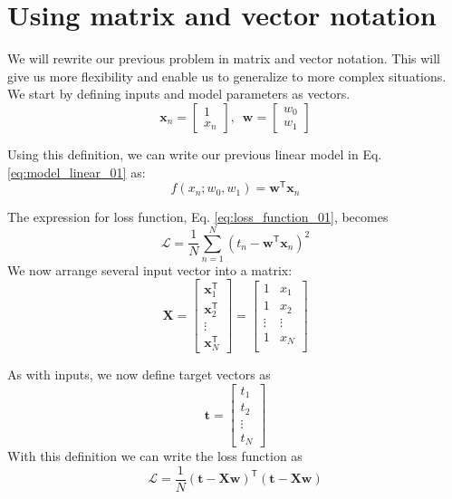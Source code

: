\section{Using matrix and vector notation}

We will rewrite our previous problem in matrix and vector notation. This will
give us more flexibility and enable us to generalize to more complex situations.
We start by defining inputs and model parameters as vectors.
\begin{equation*}
\mathbf{x}_{n} = \begin{bmatrix}
1 \\
x_{n}
\end{bmatrix}
,\,\,\,%
\mathbf{w} = \begin{bmatrix}
w_{0} \\
w_{1}
\end{bmatrix}
\end{equation*}

Using this definition, we can write our previous linear model in Eq.
\eqref{eq:model_linear_01} as:
\begin{equation}
f(x_n; w_0, w_1) = \mathbf{w}^{\mathsf{T}} \mathbf{x}_{n}
\label{eq:model_linear_02}
\end{equation}

The expression for loss function, Eq. \eqref{eq:loss_function_01}, becomes
\begin{equation}
\mathcal{L} = \frac{1}{N} \sum_{n=1}^{N} \left( t_{n} - \mathbf{w}^{\mathsf{T}}
\mathbf{x}_{n} \right)^2
\label{eq:loss_function_02}
\end{equation}
%
We now arrange several input vector into a matrix:
%
\begin{equation*}
\mathbf{X} = \begin{bmatrix}
\mathbf{x}^{\mathsf{T}}_{1} \\
\mathbf{x}^{\mathsf{T}}_{2} \\
\vdots \\
\mathbf{x}^{\mathsf{T}}_{N}
\end{bmatrix} =
\begin{bmatrix}
1 & x_{1} \\
1 & x_{2} \\
\vdots & \vdots \\
1 & x_{N} \\
\end{bmatrix}
\end{equation*}

As with inputs, we now define target vectors as
\begin{equation}
\mathbf{t} = \begin{bmatrix}
t_1 \\
t_2 \\
\vdots \\
t_N
\end{bmatrix}
\end{equation}
%
With this definition we can write the loss function as
\begin{equation}
\mathcal{L} = \frac{1}{N} \left( \mathbf{t} - \mathbf{Xw} \right)^{\mathsf{T}}
\left( \mathbf{t} - \mathbf{Xw} \right)
\end{equation}

